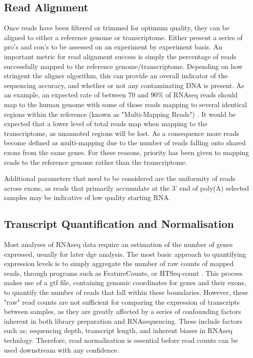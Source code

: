 \subsection{Read Alignment}
Once reads have been filtered or trimmed for optimum quality, they can be aligned to either a reference genome or transcriptome. Either present a series of pro’s and con’s to be assessed on an experiment by experiment basis. An important metric for read alignment success is simply the percentage of reads successfully mapped to the reference genome/transcriptome. Depending on how stringent the aligner algorithm, this  can provide an overall indicator of the sequencing accuracy, and whether or not any contaminating DNA is present. As an example, an expected rate of between 70 and 90\% of RNAseq reads should map to the human genome with some of those reads mapping to several identical regions within the reference (known as "Multi-Mapping Reads") \cite{Dobin2012}. It would be expected that a lower level of total reads map when mapping to the transcriptome, as unannoted regions will be lost. As a consequence more reads become defined as multi-mapping due to the number of reads falling onto shared exons from the same genes. For these reasons, priority has been given to mapping reads to the reference genome rather than the transcriptome. 

Additional parameters that need to be considered are the uniformity of reads across exons, as reads that primarily accumulate at the 3' end of poly(A) selected samples may be indicative of low quality starting RNA. 

\subsection{Transcript Quantification and Normalisation}

Most analyses of RNAseq data require an estimation of the number of genes expressed, usually for later \acrfull{dge} analysis. The most basic approach to quantifying expression levels is to simply aggregate the number of raw counts of mapped reads, through programs such as FeatureCounts, or HTSeq-count \cite{Liao2014,Anders2015}. This process makes use of a \acrfull{gtf} file, containing genomic coordinates for genes and their exons, to quantify the number of reads that fall within these boundaries. However, these "raw" read counts are not sufficient for comparing the expression of transcripts between samples, as they are greatly affected by a series of confounding factors inherent in both library preparation and RNAsequencing. These include factors such as; sequencing depth, transcript length, and inherent biases in RNAseq technlogy. Therefore, read normalisation is essential before read counts can be used downstream with any confidence. 

